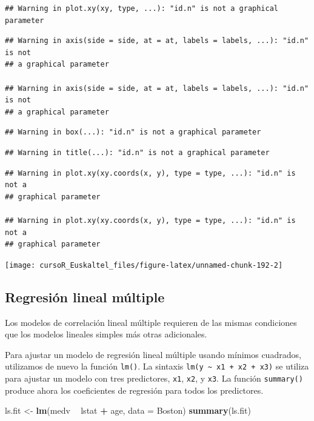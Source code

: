 \documentclass[]{book}
\newenvironment{Shaded}{\begin{snugshade}}{\end{snugshade}}
\newcommand{\KeywordTok}[1]{\textcolor[rgb]{0.13,0.29,0.53}{\textbf{#1}}}
\newcommand{\DataTypeTok}[1]{\textcolor[rgb]{0.13,0.29,0.53}{#1}}
\newcommand{\StringTok}[1]{\textcolor[rgb]{0.31,0.60,0.02}{#1}}
\newcommand{\OperatorTok}[1]{\textcolor[rgb]{0.81,0.36,0.00}{\textbf{#1}}}
\newcommand{\NormalTok}[1]{#1}
\begin{document}
\begin{verbatim}
## Warning in plot.xy(xy, type, ...): "id.n" is not a graphical parameter
\end{verbatim}

\begin{verbatim}
## Warning in axis(side = side, at = at, labels = labels, ...): "id.n" is not
## a graphical parameter

## Warning in axis(side = side, at = at, labels = labels, ...): "id.n" is not
## a graphical parameter
\end{verbatim}

\begin{verbatim}
## Warning in box(...): "id.n" is not a graphical parameter
\end{verbatim}

\begin{verbatim}
## Warning in title(...): "id.n" is not a graphical parameter
\end{verbatim}

\begin{verbatim}
## Warning in plot.xy(xy.coords(x, y), type = type, ...): "id.n" is not a
## graphical parameter

## Warning in plot.xy(xy.coords(x, y), type = type, ...): "id.n" is not a
## graphical parameter
\end{verbatim}

\begin{center}\texttt{[image: cursoR\_Euskaltel\_files/figure-latex/unnamed-chunk-192-2]} \end{center}

\subsection{Regresión lineal múltiple}\label{regresion-lineal-multiple}

Los modelos de correlación lineal múltiple requieren de las mismas
condiciones que los modelos lineales simples más otras adicionales.

Para ajustar un modelo de regresión lineal múltiple usando mínimos
cuadrados, utilizamos de nuevo la función \texttt{lm()}. La sintaxis
\texttt{lm(y\ \textasciitilde{}\ x1\ +\ x2\ +\ x3)} se utiliza para
ajustar un modelo con tres predictores, \texttt{x1}, \texttt{x2}, y
\texttt{x3}. La función \texttt{summary()} produce ahora los
coeficientes de regresión para todos los predictores.

\begin{Shaded}
\begin{Highlighting}[]
\NormalTok{ls.fit <-}\StringTok{ }\KeywordTok{lm}\NormalTok{(medv }\OperatorTok{~}\StringTok{ }\NormalTok{lstat }\OperatorTok{+}\StringTok{ }\NormalTok{age, }\DataTypeTok{data =}\NormalTok{ Boston)}
\KeywordTok{summary}\NormalTok{(ls.fit)}
\end{Highlighting}
\end{Shaded}
\end{document}
